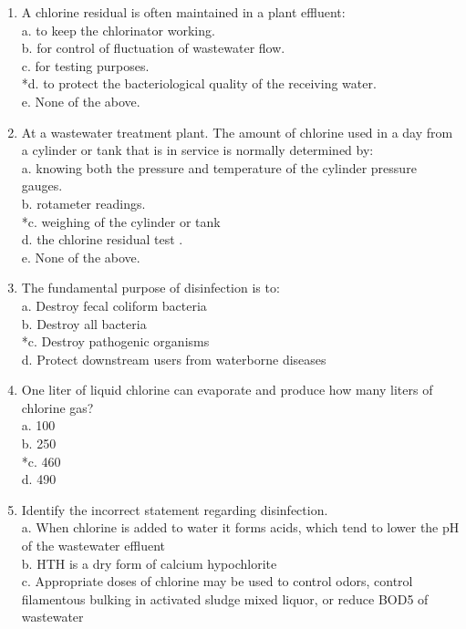 \begin{enumerate}
\item A chlorine residual is often maintained in a plant effluent: \\
a. to keep the chlorinator working. \\
b. for control of fluctuation of wastewater flow. \\
c. for testing purposes. \\
*d. to protect the bacteriological quality of the receiving water. \\
e. None of the above. \\
\item At a wastewater treatment plant. The amount of chlorine used in a day from a cylinder or tank that is in service is normally determined by: \\
a. knowing both the pressure and temperature of the cylinder pressure gauges. \\
b. rotameter readings. \\
*c. weighing of the cylinder or tank \\
d. the chlorine residual test . \\
e. None of the above. \\
\item The fundamental purpose of disinfection is to: \\
a. Destroy fecal coliform bacteria \\
b. Destroy all bacteria \\
*c. Destroy pathogenic organisms \\
d. Protect downstream users from waterborne diseases \\
\item One liter of liquid chlorine can evaporate and produce how many liters of chlorine gas? \\
a. 100 \\
b. 250 \\
*c. 460 \\
d. 490 \\
\item Identify the incorrect statement regarding disinfection. \\
a. When chlorine is added to water it forms acids, which tend to lower the pH of the wastewater effluent \\
b. HTH is a dry form of calcium hypochlorite \\
c. Appropriate doses of chlorine may be used to control odors, control filamentous bulking in activated sludge mixed liquor, or reduce BOD5 of wastewater \\

\end{enumerate}
